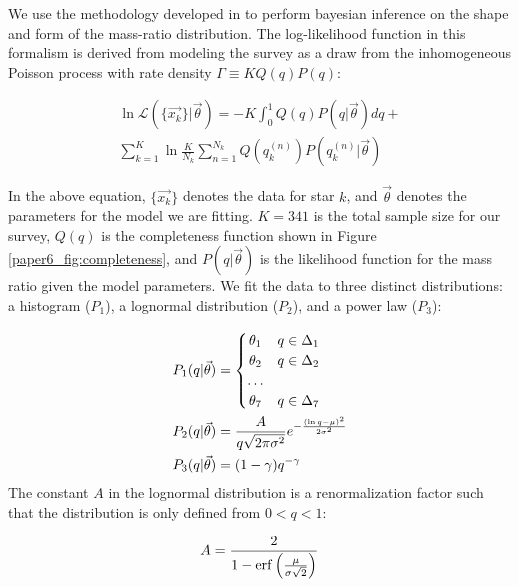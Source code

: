 We use the methodology developed in \citet{Foreman2014} to perform bayesian inference on the shape and form of the mass-ratio distribution. The log-likelihood function in this formalism is derived from modeling the survey as a draw from the inhomogeneous Poisson process with rate density $\Gamma \equiv KQ(q)P(q)$:

\begin{multline}
\ln{\mathcal{L}(\{\vec{x_k}\}| \vec{\theta})} = -K \int_0^1 Q(q)P(q|\vec{\theta})dq + \\ \sum_{k=1}^K \ln{\frac{K}{N_k} \sum_{n=1}^{N_k} Q(q_k^{(n)}) P(q_k^{(n)}|\vec{\theta})}
\label{paper6_eqn:money}
\end{multline}

In the above equation, $\{\vec{x_k}\}$ denotes the data for star $k$, and $\vec{\theta}$ denotes the parameters for the model we are fitting. $K=341$ is the total sample size for our survey, $Q(q)$ is the completeness function shown in Figure \ref{paper6_fig:completeness}, and $P(q|\vec{\theta})$ is the likelihood function for the mass ratio given the model parameters. We fit the data to three distinct distributions: a histogram ($P_1$), a lognormal distribution ($P_2$), and a power law ($P_3$):

\begin{align}
 P_1(q|\vec{\theta}) &= \begin{cases}
      \hfill \theta_1 \hfill & q \in \Delta_1 \\
      \hfill \theta_2 \hfill & q \in \Delta_2 \\
      \hfill \ldots \\
      \hfill \theta_7 \hfill & q \in \Delta_7
     \end{cases} \label{paper6_eqn:P1} \\
 P_2(q|\vec{\theta}) &= \frac{A}{q\sqrt{2\pi\sigma^2}} e^{-\frac{(\ln{q} - \mu)^2}{2\sigma^2}} \label{paper6_eqn:P2} \\
 P_3(q|\vec{\theta}) &= (1-\gamma)q^{-\gamma} \label{paper6_eqn:P3}
\end{align}
The constant $A$ in the lognormal distribution is a renormalization factor such that the distribution is only defined from $0 < q < 1$:

\begin{equation}
A = \frac{2}{1-\operatorname{erf}\left(\frac{\mu}{\sigma \sqrt{2}}\right)}
\end{equation}

